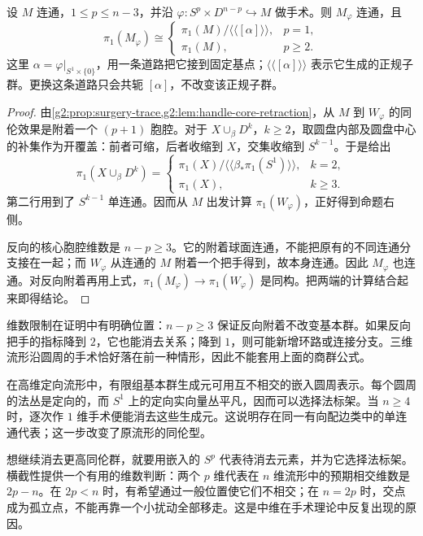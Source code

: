\begin{proposition}\label{g2:prop:surgery-fundamental-group}
	设 \(M\) 连通，\(1\le p\le n-3\)，并沿 \(\varphi:S^p\times D^{n-p}\hookrightarrow M\) 做手术。则 \(M_\varphi\) 连通，且
	\[
		\pi_1(M_\varphi)\cong
		\begin{cases}
			\pi_1(M)/\langle\!\langle[\alpha]\rangle\!\rangle,&p=1,\\
			\pi_1(M),&p\ge2.
		\end{cases}
	\]
	这里 \(\alpha=\varphi|_{S^1\times\{0\}}\)，用一条道路把它接到固定基点；\(\langle\!\langle[\alpha]\rangle\!\rangle\) 表示它生成的正规子群。更换这条道路只会共轭 \([\alpha]\)，不改变该正规子群。
\end{proposition}
\begin{proof}
	由\cref{g2:prop:surgery-trace,g2:lem:handle-core-retraction}，从 \(M\) 到 \(W_\varphi\) 的同伦效果是附着一个 \((p+1)\) 胞腔。对于 \(X\cup_\beta D^k\)，\(k\ge2\)，取圆盘内部及圆盘中心的补集作为开覆盖：前者可缩，后者收缩到 \(X\)，交集收缩到 \(S^{k-1}\)。于是给出
	\[
		\pi_1(X\cup_\beta D^k)=
		\begin{cases}
			\pi_1(X)/\langle\!\langle\beta_*\pi_1(S^1)\rangle\!\rangle,&k=2,\\
			\pi_1(X),&k\ge3.
		\end{cases}
	\]
	第二行用到了 \(S^{k-1}\) 单连通。因而从 \(M\) 出发计算 \(\pi_1(W_\varphi)\)，正好得到命题右侧。

	反向的核心胞腔维数是 \(n-p\ge3\)。它的附着球面连通，不能把原有的不同连通分支接在一起；而 \(W_\varphi\) 从连通的 \(M\) 附着一个把手得到，故本身连通。因此 \(M_\varphi\) 也连通。对反向附着再用上式，\(\pi_1(M_\varphi)\to\pi_1(W_\varphi)\) 是同构。把两端的计算结合起来即得结论。
\end{proof}

维数限制在证明中有明确位置：\(n-p\ge3\) 保证反向附着不改变基本群。如果反向把手的指标降到 \(2\)，它也能消去关系；降到 \(1\)，则可能新增环路或连接分支。三维流形沿圆周的手术恰好落在前一种情形，因此不能套用上面的商群公式。

\ProseParagraphBreak

在高维定向流形中，有限组基本群生成元可用互不相交的嵌入圆周表示。每个圆周的法丛是定向的，而 \(S^1\) 上的定向实向量丛平凡，因而可以选择法标架。当 \(n\ge4\) 时，逐次作 \(1\) 维手术便能消去这些生成元。这说明存在同一有向配边类中的单连通代表；这一步改变了原流形的同伦型。

\ProseParagraphBreak

想继续消去更高同伦群，就要用嵌入的 \(S^p\) 代表待消去元素，并为它选择法标架。横截性提供一个有用的维数判断：两个 \(p\) 维代表在 \(n\) 维流形中的预期相交维数是 \(2p-n\)。在 \(2p<n\) 时，有希望通过一般位置使它们不相交；在 \(n=2p\) 时，交点成为孤立点，不能再靠一个小扰动全部移走。这是中维在手术理论中反复出现的原因。

